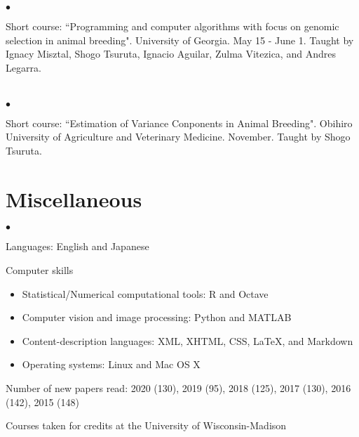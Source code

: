 \documentclass[margin,line,10pt]{res}
\newenvironment{list2}{
  \begin{list}{$\bullet$}{%
      \setlength{\itemsep}{0in}
      \setlength{\parsep}{0in} \setlength{\parskip}{0in}
      \setlength{\topsep}{0in} \setlength{\partopsep}{0in} 
      \setlength{\leftmargin}{0.2in}}}{\end{list}}
\begin{document}
\begin{resume}
\begin{list2}
\item Short course: ``Programming and computer algorithms with focus on genomic selection in animal breeding".  University of Georgia. May 15 - June 1.  
Taught by Ignacy Misztal, Shogo Tsuruta, Ignacio Aguilar, Zulma Vitezica, and  Andres Legarra. 
\end{list2}  

\section{}
\begin{list2}
\item Short course: ``Estimation of Variance Conponents in Animal Breeding". Obihiro University of Agriculture and Veterinary Medicine. November. 
Taught by Shogo Tsuruta.  
\end{list2}  



\vspace{0.5cm}
\section{\sc Miscellaneous} 
\begin{list2}

\item Languages: English and Japanese
  \vspace{0.3cm}

\item Computer skills 
  \begin{itemize}
  \item Statistical/Numerical computational tools: R and Octave
  \item Computer vision and image processing: Python and MATLAB
  \item Content-description languages: XML, XHTML, CSS, \LaTeX, and Markdown
  \item Operating systems: Linux and Mac OS X
  \end{itemize}


  \vspace{0.3cm}
\item Number of new papers read: 2020 (130), 2019 (95), 2018 (125), 2017 (130), 2016 (142), 2015 (148)


  \vspace{0.3cm}
\item Courses taken for credits at the University of Wisconsin-Madison 
  \begin{itemize}


\end{itemize}
\end{list2}
\end{resume}
\end{document}
